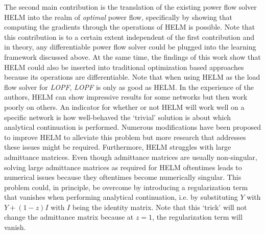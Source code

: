 The second main contribution is the translation of the existing power flow solver HELM into the realm of \emph{optimal} power flow, specifically by showing that computing the gradients through the operations of HELM is possible. Note that this contribution is to a certain extent independent of the first contribution and in theory, any differentiable power flow solver could be plugged into the learning framework discussed above. At the same time, the findings of this work show that HELM could also be inserted into traditional optimization based approaches because its operations are differentiable. Note that when using HELM as the load flow solver for \emph{LOPF}, \emph{LOPF} is only as good as HELM. In the experience of the authors, HELM can show impressive results for some networks but then work poorly on others. An indicator for whether or not HELM will work well on a specific network is how well-behaved the `trivial' solution is about which analytical continuation is performed. Numerous modifications have been proposed to improve HELM to alleviate this problem but more research that addresses these issues might be required. Furthermore, HELM struggles with large admittance matrices.  Even though admittance matrices are usually non-singular, solving large admittance matrices as required for HELM oftentimes leads to numerical issues because they oftentimes become numerically singular. This problem could, in principle, be overcome by introducing a regularization term that vanishes when performing analytical continuation, i.e. by substituting $Y$ with $Y + (1-z)I$ with $I$ being the identity matrix. Note that this `trick' will not change the admittance matrix because at $z=1$, the regularization term will vanish.



